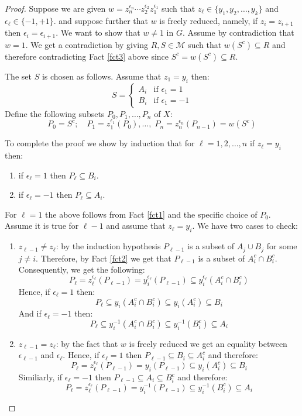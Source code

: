 \documentclass[12pt]{article}
\begin{document}
\begin{proof}
Suppose we are given $w=z_n^{\epsilon_n}\cdots
z_2^{\epsilon_2}z_1^{\epsilon_1}$ such that
$z_\ell\in\{y_1,y_2,\ldots,y_k\}$ and $\epsilon_\ell\in\{-1,+1\}$.
and suppose further that $w$ is freely reduced, namely, if
$z_i=z_{i+1}$ then $\epsilon_i=\epsilon_{i+1}$. We want to show
that $w\neq1$ in $G$. Assume by contradiction that $w=1$. We get a
contradiction by giving $R,S\in\mathcal{M}$ such that
$w(S^c)\subseteq R$ and therefore contradicting Fact \ref{fct3}
above since $S^c=w(S^c)\subseteq R$.

The set $S$ is chosen as follows. Assume that $z_1=y_i$ then:
\[
S=\left\{\begin{array}{ll}
  A_i & \text{if } \epsilon_1=1 \\
  B_i & \text{if } \epsilon_1=-1
\end{array} \right.
\]
Define the following subsets $P_0,P_1,\ldots,P_n$ of $X$:
\[
P_0 = S^c; \quad P_1=z_1^{\epsilon_1}(P_0), \ldots ,\;
P_n=z_n^{\epsilon_n}(P_{n-1})=w(S^c)
\]


To complete the proof we show by induction that for
$\ell=1,2,\ldots,n$ if $z_\ell=y_i$ then:
\begin{enumerate}
  \item if $\epsilon_\ell=1$ then $P_\ell\subseteq B_i$.
  \item if $\epsilon_\ell=-1$ then $P_\ell\subseteq A_i$.
\end{enumerate}
For $\ell=1$ the above follows from Fact \ref{fct1} and the
specific choice of $P_0$. Assume it is true for $\ell-1$ and
assume that $z_\ell=y_i$. We have two cases to check:
\begin{enumerate}
 \item $z_{\ell-1}\neq z_\ell$: by the induction hypothesis
 $P_{\ell-1}$ is a subset of $A_j\cup B_j$ for some $j\neq i$.
 Therefore, by Fact \ref{fct2} we get that $P_{\ell-1}$ is a subset of $A_i^c\cap B_i^c$.
 Consequently, we get the following:
 \[
 P_\ell = z_\ell^{\epsilon_\ell}(P_{\ell-1}) = y_i^{\epsilon_\ell}(P_{\ell-1})
 \subseteq y_i^{\epsilon_\ell}(A_i^c\cap B_i^c)
 \]
 Hence, if $\epsilon_\ell=1$ then:
 \[
 P_\ell \subseteq y_i(A_i^c\cap B_i^c) \subseteq y_i(A_i^c) \subseteq B_i
 \]
 And if $\epsilon_\ell=-1$ then:
 \[
 P_\ell \subseteq y_i^{-1}(A_i^c\cap B_i^c) \subseteq y_i^{-1}(B_i^c) \subseteq A_i
 \]
 \item $z_{\ell-1}=z_\ell$: by the fact that $w$ is freely reduced we
 get an equality between $\epsilon_{\ell-1}$ and $\epsilon_\ell$. Hence, if
 $\epsilon_\ell=1$ then $P_{\ell-1}\subseteq B_i\subseteq A_i^c$ and
 therefore:
 \[
 P_\ell = z_\ell^{\epsilon_\ell}(P_{\ell-1}) = y_i(P_{\ell-1})
 \subseteq y_i(A_i^c) \subseteq B_i
 \]
 Similiarly, if $\epsilon_\ell=-1$ then $P_{\ell-1}\subseteq A_i\subseteq
 B_i^c$ and therefore:
 \[
 P_\ell = z_\ell^{\epsilon_\ell}(P_{\ell-1}) = y_i^{-1}(P_{\ell-1})
 \subseteq y_i^{-1}(B_i^c) \subseteq A_i
 \]
\end{enumerate}

\end{proof}

\end{document}
